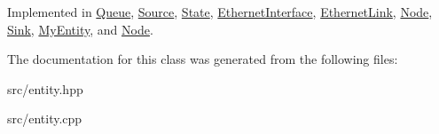 Implemented in \hyperlink{classQueue_a130518a0de553ebf8c9f06b838a818ae}{Queue}, \hyperlink{classSource_ac93437b75678d35efaf8b92cdf0092fa}{Source}, \hyperlink{classState_a8761f5b93680e53fefbb5d930ded276e}{State}, \hyperlink{classEthernetInterface_a484a93873c9151b62b0c909283b64f16}{Ethernet\+Interface}, \hyperlink{classEthernetLink_ad1e1ffee1fa7dcc8aa7ac4cf564a28fc}{Ethernet\+Link}, \hyperlink{classNode_a7154231b573b4f86f200b890b580cc14}{Node}, \hyperlink{classSink_a39d08501b759e325aec611e6fc9ef851}{Sink}, \hyperlink{classMyEntity_a3a19fa3aefcdd55caabe2ea5116d5c3b}{My\+Entity}, and \hyperlink{classNode_a91735637f2d85d4dfd1bc6e39e12e624}{Node}.



The documentation for this class was generated from the following files\+:\begin{DoxyCompactItemize}
\item 
src/entity.\+hpp\item 
src/entity.\+cpp\end{DoxyCompactItemize}

